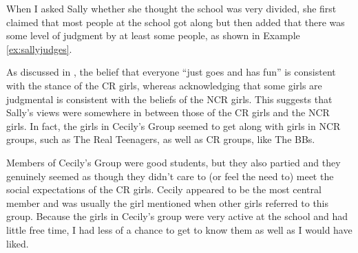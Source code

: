 When I asked Sally whether she thought the school was very divided, she first claimed that most people at the school got along but then added that there was some level of judgment by at least some people, as shown in Example \ref{ex:sallyjudges}.

\label{ex:sallyjudges}

\noindent As discussed in  , the belief that everyone ``just goes and has fun'' is consistent with the stance of the CR girls, whereas acknowledging that some girls are judgmental is consistent with the beliefs of the NCR girls. This suggests that Sally's views were somewhere in between those of the CR girls and the NCR girls.  In fact, the girls in Cecily's Group seemed to get along with girls in NCR groups, such as The Real Teenagers, as well as CR groups, like The BBs. 

Members of Cecily's Group were good students, but they also partied and they genuinely seemed as though they didn't care to (or feel the need to) meet the social expectations of the CR girls. Cecily appeared to be the most central member and was usually the girl mentioned when other girls referred to this group. Because the girls in Cecily's group were very active at the school and had little free time, I had less of a chance to get to know them as well as I would have liked. 




